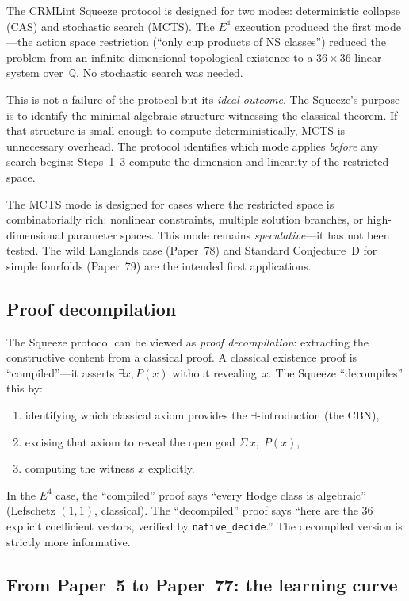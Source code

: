 \documentclass[11pt]{article}
\theoremstyle{plain}
\theoremstyle{definition}
\theoremstyle{remark}
\newcommand{\Q}{\mathbb{Q}}
\begin{document}
The CRMLint Squeeze protocol is designed for two modes:
deterministic collapse (CAS) and stochastic search (MCTS).  The
$E^4$ execution produced the first mode---the action space
restriction (``only cup products of NS classes'') reduced the
problem from an infinite-dimensional topological existence to a
$36 \times 36$ linear system over~$\Q$.  No stochastic search was
needed.

This is not a failure of the protocol but its \emph{ideal outcome}.
The Squeeze's purpose is to identify the minimal algebraic
structure witnessing the classical theorem.  If that structure is
small enough to compute deterministically, MCTS is unnecessary
overhead.  The protocol identifies which mode applies
\emph{before} any search begins: Steps~1--3 compute the dimension
and linearity of the restricted space.

The MCTS mode is designed for cases where the restricted space is
combinatorially rich: nonlinear constraints, multiple solution
branches, or high-dimensional parameter spaces.  This mode remains
\emph{speculative}---it has not been tested.  The wild
Langlands case (Paper~78) and Standard Conjecture~D for simple
fourfolds (Paper~79) are the intended first applications.

\subsection{Proof decompilation}

The Squeeze protocol can be viewed as \emph{proof decompilation}:
extracting the constructive content from a classical proof.  A
classical existence proof is ``compiled''---it asserts $\exists x,
P(x)$ without revealing~$x$.  The Squeeze ``decompiles'' this by:
\begin{enumerate}[nosep]
\item identifying which classical axiom provides the
  $\exists$-introduction (the CBN),
\item excising that axiom to reveal the open goal
  $\Sigma\,x,\; P(x)$,
\item computing the witness $x$ explicitly.
\end{enumerate}
In the $E^4$ case, the ``compiled'' proof says ``every Hodge
class is algebraic'' (Lefschetz $(1,1)$, classical).  The
``decompiled'' proof says ``here are the 36 explicit coefficient
vectors, verified by \texttt{native\_decide}.''  The decompiled
version is strictly more informative.

\subsection{From Paper~5 to Paper~77: the learning curve}%
\label{sec:learningcurve}
\end{document}
